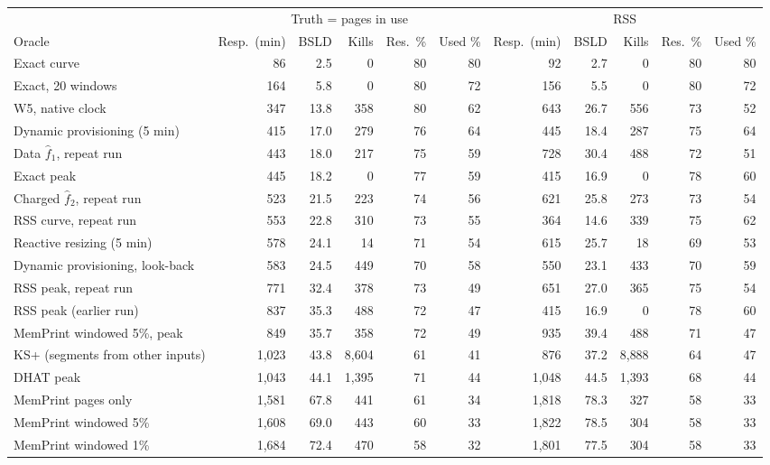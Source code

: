 \begin{tabular}{lrrrrrrrrrr}
\toprule
 & \multicolumn{5}{c}{Truth = pages in use} & \multicolumn{5}{c}{RSS} \\
\cmidrule(lr){2-6} \cmidrule(lr){7-11}
Oracle & Resp.\ (min) & BSLD & Kills & Res.\ \% & Used \% & Resp.\ (min) & BSLD & Kills & Res.\ \% & Used \% \\
\midrule
Exact curve & 86 & 2.5 & 0 & 80 & 80 & 92 & 2.7 & 0 & 80 & 80 \\
Exact, 20 windows & 164 & 5.8 & 0 & 80 & 72 & 156 & 5.5 & 0 & 80 & 72 \\
\memprint{} W5, native clock & 347 & 13.8 & 358 & 80 & 62 & 643 & 26.7 & 556 & 73 & 52 \\
Dynamic provisioning (5 min) & 415 & 17.0 & 279 & 76 & 64 & 445 & 18.4 & 287 & 75 & 64 \\
Data $\hat f_1$, repeat run & 443 & 18.0 & 217 & 75 & 59 & 728 & 30.4 & 488 & 72 & 51 \\
Exact peak & 445 & 18.2 & 0 & 77 & 59 & 415 & 16.9 & 0 & 78 & 60 \\
Charged $\hat f_2$, repeat run & 523 & 21.5 & 223 & 74 & 56 & 621 & 25.8 & 273 & 73 & 54 \\
RSS curve, repeat run & 553 & 22.8 & 310 & 73 & 55 & 364 & 14.6 & 339 & 75 & 62 \\
Reactive resizing (5 min) & 578 & 24.1 & 14 & 71 & 54 & 615 & 25.7 & 18 & 69 & 53 \\
Dynamic provisioning, look-back & 583 & 24.5 & 449 & 70 & 58 & 550 & 23.1 & 433 & 70 & 59 \\
RSS peak, repeat run & 771 & 32.4 & 378 & 73 & 49 & 651 & 27.0 & 365 & 75 & 54 \\
RSS peak (earlier run) & 837 & 35.3 & 488 & 72 & 47 & 415 & 16.9 & 0 & 78 & 60 \\
MemPrint windowed 5\%, peak & 849 & 35.7 & 358 & 72 & 49 & 935 & 39.4 & 488 & 71 & 47 \\
KS+ (segments from other inputs) & 1{,}023 & 43.8 & 8{,}604 & 61 & 41 & 876 & 37.2 & 8{,}888 & 64 & 47 \\
DHAT peak & 1{,}043 & 44.1 & 1{,}395 & 71 & 44 & 1{,}048 & 44.5 & 1{,}393 & 68 & 44 \\
MemPrint pages only & 1{,}581 & 67.8 & 441 & 61 & 34 & 1{,}818 & 78.3 & 327 & 58 & 33 \\
MemPrint windowed 5\% & 1{,}608 & 69.0 & 443 & 60 & 33 & 1{,}822 & 78.5 & 304 & 58 & 33 \\
MemPrint windowed 1\% & 1{,}684 & 72.4 & 470 & 58 & 32 & 1{,}801 & 77.5 & 304 & 58 & 33 \\

\end{tabular}
